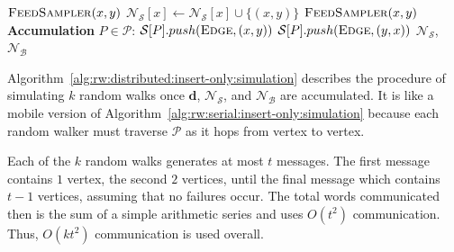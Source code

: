 \documentclass[10]{report}
\newcommand{\push}[1]{\text{push} \left ( #1 \right )}
\newcommand{\algoname}[1]{\textnormal{\textsc{#1}}}
\begin{document}
\begin{algorithm}[htbp]
\begin{flushleft}
\begin{algorithmic}[1]
				\State $\algoname{FeedSampler}(x, y)$
			\ElsIf{$\xi = \algoname{Small}$}
				\State $\mathcal{N}_\mathcal{S}[x] \gets \mathcal{N}_\mathcal{S}[x] \cup \{(x, y)\}$
			\ElsIf{$\xi = \algoname{Big}$}
				\State $\algoname{FeedSampler}(x, y)$
			\EndIf
  		\EndWhile
	\Statex \textbf{Accumulation} $P \in \mathcal{P}$:
			\State $\mathcal{S}[P].push(\algoname{Edge}, (x, y))$
			\State $\mathcal{S}[P].push(\algoname{Edge}, (y, x))$
		\EndFor
		\State \Return $\mathcal{N}_\mathcal{S}$, $\mathcal{N}_\mathcal{B}$
\end{algorithmic}
\end{flushleft}
\end{algorithm}



Algorithm~\ref{alg:rw:distributed:insert-only:simulation} describes the procedure of simulating $k$ random walks once $\mathbf{d}$, $\mathcal{N}_\mathcal{S}$, and $\mathcal{N}_\mathcal{B}$ are accumulated.
It is like a mobile version of Algorithm~\ref{alg:rw:serial:insert-only:simulation} because each random walker must traverse $\mathcal{P}$ as it hops from vertex to vertex.

Each of the $k$ random walks generates at most $t$ messages.
The first message contains $1$ vertex, the second $2$ vertices, until the final message which contains $t-1$ vertices, assuming that no failures occur.
The total words communicated then is the sum of a simple arithmetic series and uses $O(t^2)$ communication.
Thus, $O(kt^2)$ communication is used overall.
\end{document}
